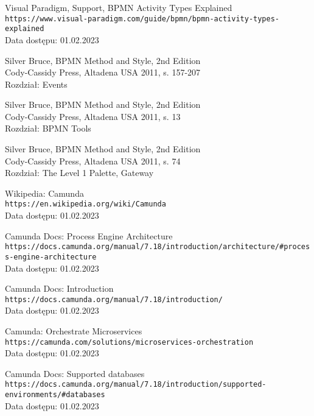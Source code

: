 \documentclass[declaration,shortabstract,mgr]{iithesis}
\begin{document}
\begin{thebibliography}{1}
Visual Paradigm, Support, BPMN Activity Types Explained \\
\texttt{https://www.visual-paradigm.com/guide/bpmn/bpmn-activity-types-explained} \\
Data dostępu: 01.02.2023

Silver Bruce, BPMN Method and Style, 2nd Edition \\
Cody-Cassidy Press, Altadena USA 2011, s. 157-207 \\
Rozdział: Events

Silver Bruce, BPMN Method and Style, 2nd Edition \\
Cody-Cassidy Press, Altadena USA 2011, s. 13 \\
Rozdział: BPMN Tools

Silver Bruce, BPMN Method and Style, 2nd Edition \\
Cody-Cassidy Press, Altadena USA 2011, s. 74 \\
Rozdział: The Level 1 Palette, Gateway

Wikipedia: Camunda \\
\texttt{https://en.wikipedia.org/wiki/Camunda} \\
Data dostępu: 01.02.2023

Camunda Docs: Process Engine Architecture \\
\texttt{https://docs.camunda.org/manual/7.18/introduction/architecture/\#process-engine-architecture} \\
Data dostępu: 01.02.2023

Camunda Docs: Introduction \\
\texttt{https://docs.camunda.org/manual/7.18/introduction/} \\
Data dostępu: 01.02.2023

Camunda: Orchestrate Microservices \\
\texttt{https://camunda.com/solutions/microservices-orchestration} \\
Data dostępu: 01.02.2023

Camunda Docs: Supported databases \\
\texttt{https://docs.camunda.org/manual/7.18/introduction/supported-environments/\#databases} \\
Data dostępu: 01.02.2023


\end{thebibliography}
\end{document}

